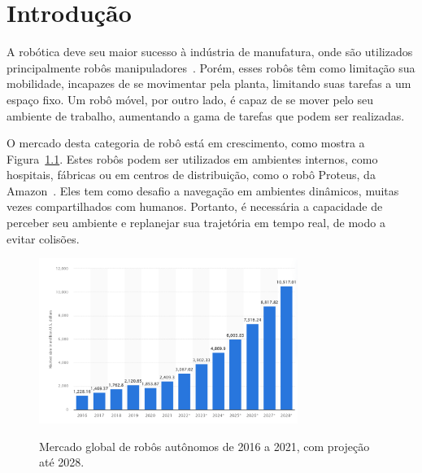 \documentclass[repeatfields,xlists,xpacks,oneside,yearsonly]{ufrgscca}
\begin{document}
\tableofcontents

\chapter{Introdução}



A robótica deve seu maior sucesso à indústria de manufatura, onde são
utilizados principalmente robôs
manipuladores~\cite{IntroductionToMobileRobots}. Porém, esses robôs
têm como limitação sua mobilidade, incapazes de se movimentar pela
planta, limitando suas tarefas a um espaço fixo. Um robô móvel, por
outro lado, é capaz de se mover pelo seu ambiente de trabalho,
aumentando a gama de tarefas que podem ser realizadas.

O mercado desta categoria de robô está em crescimento, como mostra a
Figura~\ref{fig:mercado_robo}. Estes robôs podem ser utilizados em
ambientes internos, como hospitais, fábricas ou em centros de
distribuição, como o robô Proteus, da Amazon~\cite{amazon_robot}.
Eles tem como desafio a navegação em ambientes dinâmicos, muitas
vezes compartilhados com humanos. Portanto, é necessária a capacidade
de perceber seu ambiente e replanejar sua trajetória em tempo real,
de modo a evitar colisões. 

\begin{figure}[htbp]
    {
        \centering
        \caption{Mercado global de robôs autônomos de 2016 a 2021, com projeção até 2028.}
        \label{fig:mercado_robo}
        \includegraphics[width=0.75\textwidth]{mercado_robo}\\
    }
    {}
\end{figure}
\end{document}
